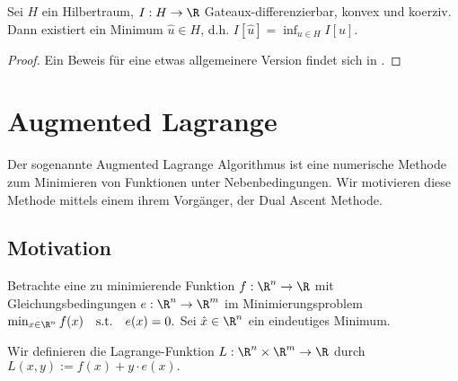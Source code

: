 \documentclass{mythesis}
\begin{document}
\begin{theorem} \label{theorem:min_existence}
    Sei $H$ ein Hilbertraum, $I: H \to \R$ Gateaux-differenzierbar, konvex und koerziv.
    Dann existiert ein Minimum $\hat u \in H$, d.h.
    \begin{math}
        I[\hat u] = \inf_{u \in H} I[u].
    \end{math}
    \begin{proof}
        Ein Beweis für eine etwas allgemeinere Version findet sich in \cite[Theorem 7.3.8]{kurdila2006convex}.
    \end{proof}
\end{theorem}


\section{Augmented Lagrange} \label{section:augmented_lagrange}

Der sogenannte Augmented Lagrange Algorithmus ist eine numerische Methode zum Minimieren von Funktionen unter Nebenbedingungen.
Wir motivieren diese Methode mittels einem ihrem Vorgänger, der Dual Ascent Methode.

\subsection*{Motivation}

Betrachte eine zu minimierende Funktion $f: \R^n \to \R$ mit Gleichungsbedingungen $e: \R^n \to \R^m$ im Minimierungsproblem
\begin{math}[numbered] \label{eq:min_eq}
    \min_{x \in \R^n} f(x)
    \quad \mathrm{s.t.} \quad
    e(x) = 0.
\end{math}
Sei $\hat x \in \R^n$ ein eindeutiges Minimum.

Wir definieren die Lagrange-Funktion $L: \R^n \times \R^m \to \R$ durch
\begin{math}
    L(x,y) := f(x) + y \cdot e(x).
\end{math}
\end{document}
